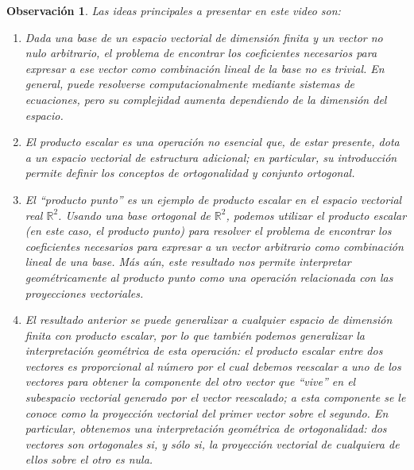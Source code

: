\documentclass[12pt,dvipsnames]{article}
\newtheorem{obs}{Observación}[section]
\numberwithin{equation}{section}
\begin{document}
\begin{obs}
Las ideas principales a presentar en este video son:
\begin{enumerate}[label=(\roman*)]
    \item Dada una base de un espacio vectorial de dimensión finita y un vector no nulo arbitrario, el problema de encontrar los coeficientes necesarios para expresar a ese vector como combinación lineal de la base no es trivial. En general, puede resolverse computacionalmente mediante sistemas de ecuaciones, pero su complejidad aumenta dependiendo de la dimensión del espacio.
    
    \item El producto escalar es una operación no esencial que, de estar presente, dota a un espacio vectorial de estructura adicional; en particular, su introducción permite definir los conceptos de ortogonalidad y conjunto ortogonal. 
    
    \item El ``producto punto'' es un ejemplo de producto escalar en el espacio vectorial real $\mathbb{R}^2$. Usando una base ortogonal de $\mathbb{R}^2$, podemos utilizar el producto escalar (en este caso, el producto punto) para resolver el problema de encontrar los coeficientes necesarios para expresar a un vector arbitrario como combinación lineal de una base. Más aún, este resultado nos permite interpretar geométricamente al producto punto como una operación relacionada con las proyecciones vectoriales. %

    \item El resultado anterior se puede generalizar a cualquier espacio de dimensión finita con producto escalar, por lo que también podemos generalizar la interpretación geométrica de esta operación: el producto escalar entre dos vectores es proporcional al número por el cual debemos reescalar a uno de los vectores para obtener la componente del otro vector que ``vive'' en el subespacio vectorial generado por el vector reescalado; a esta componente se le conoce como la \emph{proyección vectorial} del primer vector sobre el segundo. En particular, obtenemos una interpretación geométrica de ortogonalidad: dos vectores son ortogonales si, y sólo si, la proyección vectorial de cualquiera de ellos sobre el otro es nula.
\end{enumerate}
\end{obs}
\end{document}
